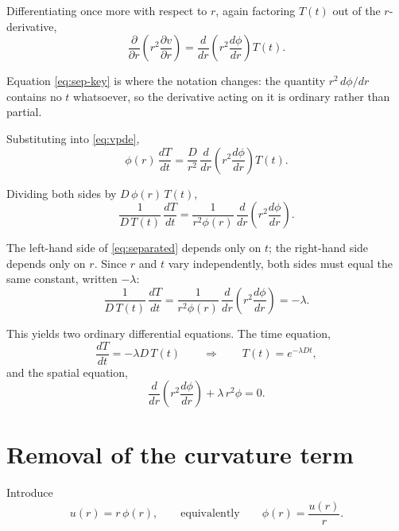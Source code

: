 \documentclass[11pt,a4paper]{article}
\begin{document}
Differentiating once more with respect to $r$, again factoring $T(t)$ out of the
$r$-derivative,
\begin{equation}
\frac{\partial}{\partial r}\!\left(r^{2}\frac{\partial v}{\partial r}\right)
= \frac{d}{dr}\!\left(r^{2}\frac{d\phi}{dr}\right) T(t) .
\label{eq:sep-key}
\end{equation}

Equation \eqref{eq:sep-key} is where the notation changes: the quantity
$r^{2}\,d\phi/dr$ contains no $t$ whatsoever, so the derivative acting on it is
ordinary rather than partial.

Substituting into \eqref{eq:vpde},
\begin{equation}
\phi(r)\,\frac{dT}{dt}
= \frac{D}{r^{2}}\,\frac{d}{dr}\!\left(r^{2}\frac{d\phi}{dr}\right) T(t) .
\end{equation}

Dividing both sides by $D\,\phi(r)\,T(t)$,
\begin{equation}
\frac{1}{D\,T(t)}\,\frac{dT}{dt}
= \frac{1}{r^{2}\phi(r)}\,\frac{d}{dr}\!\left(r^{2}\frac{d\phi}{dr}\right) .
\label{eq:separated}
\end{equation}

The left-hand side of \eqref{eq:separated} depends only on $t$; the right-hand side
depends only on $r$. Since $r$ and $t$ vary independently, both sides must equal the
same constant, written $-\lambda$:
\begin{equation}
\frac{1}{D\,T(t)}\,\frac{dT}{dt}
= \frac{1}{r^{2}\phi(r)}\,\frac{d}{dr}\!\left(r^{2}\frac{d\phi}{dr}\right)
= -\lambda .
\end{equation}

This yields two ordinary differential equations. The time equation,
\begin{equation}
\frac{dT}{dt} = -\lambda D\,T(t)
\qquad \Longrightarrow \qquad
T(t) = e^{-\lambda D t} ,
\label{eq:timeeq}
\end{equation}
and the spatial equation,
\begin{equation}
\frac{d}{dr}\!\left(r^{2}\frac{d\phi}{dr}\right) + \lambda\,r^{2}\phi = 0 .
\label{eq:spatial}
\end{equation}

\section{Removal of the curvature term}

Introduce
\begin{equation}
u(r) = r\,\phi(r) ,
\qquad\text{equivalently}\qquad
\phi(r) = \frac{u(r)}{r} .
\end{equation}
\end{document}
